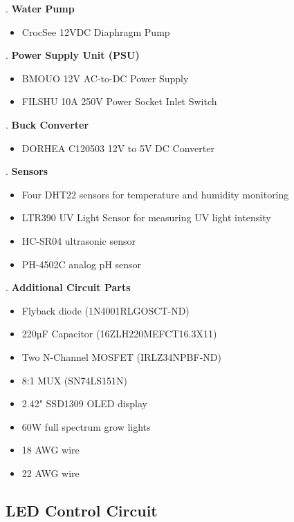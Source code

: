 \documentclass[12pt]{article}
\begin{document}
. \textbf{Water Pump}
\begin{itemize}
    \item CrocSee 12VDC Diaphragm Pump
\end{itemize}

. \textbf{Power Supply Unit (PSU)} 
\begin{itemize}
    \item BMOUO 12V AC-to-DC Power Supply 
    \item FILSHU 10A 250V Power Socket Inlet Switch
\end{itemize}

. \textbf{Buck Converter}
\begin{itemize}
    \item DORHEA C120503 12V to 5V DC Converter
\end{itemize}

. \textbf{Sensors}
   \begin{itemize}
   \item Four DHT22 sensors for temperature and humidity monitoring
   \item LTR390 UV Light Sensor for measuring UV light intensity
   \item HC-SR04 ultrasonic sensor
   \item PH-4502C analog pH sensor
   \end{itemize}

. \textbf{Additional Circuit Parts}
   \begin{itemize}
   \item Flyback diode (1N4001RLGOSCT-ND)
   \item 220µF Capacitor (16ZLH220MEFCT16.3X11)
   \item Two N-Channel MOSFET (IRLZ34NPBF-ND)
   \item 8:1 MUX (SN74LS151N)
   \item 2.42" SSD1309 OLED display
   \item 60W full spectrum grow lights
   \item 18 AWG wire
   \item 22 AWG wire
   \end{itemize}


\subsection{LED Control Circuit}
\end{document}
